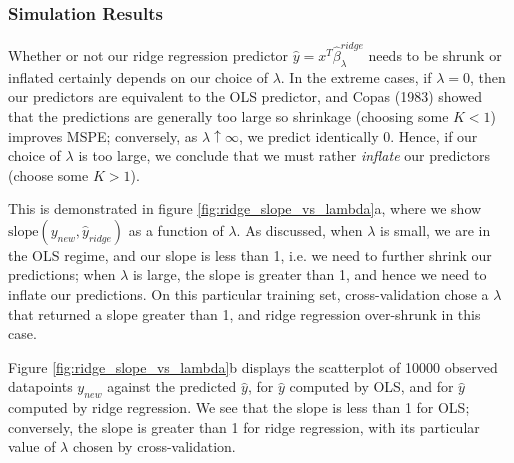\documentclass[main]{subfiles}
\begin{document}
\subsubsection{Simulation Results}
Whether or not our ridge regression predictor $\hat y = x^T \hat\beta^{ridge}_\lambda$ needs to be
shrunk or inflated certainly depends on our
choice of $\lambda$. In the extreme cases, if $\lambda = 0$, then our predictors are equivalent to the OLS predictor,
and Copas (1983)
showed that the predictions are generally too large so shrinkage (choosing some $K < 1$) improves MSPE;
conversely, as $\lambda \uparrow \infty$, we predict identically 0. Hence,
if our choice of $\lambda$ is too large, we conclude that we must rather {\itshape inflate} our predictors (choose some $K > 1$).

This is demonstrated in figure
\ref{fig:ridge_slope_vs_lambda}a, where we show $\text{slope}(y_{new}, \hat y_{ridge})$ as a function of $\lambda$.
As discussed, when $\lambda$ is small, we are in the OLS regime, and our slope is less than 1, i.e. we need to further shrink our predictions;
when $\lambda$ is large, the slope is greater than 1, and hence we need to inflate our predictions.
On this particular training set, cross-validation
chose a $\lambda$ that returned a slope greater than 1, and
ridge regression over-shrunk in this case.

Figure \ref{fig:ridge_slope_vs_lambda}b displays the scatterplot of 10000 observed datapoints $y_{new}$
against the predicted $\hat y$,
for $\hat y$ computed by OLS, and
for $\hat y$
computed by ridge regression. We see that the slope is less than 1 for
OLS; conversely, the slope is greater than 1 for ridge regression,
with its particular value of $\lambda$ chosen by cross-validation.
\end{document}

